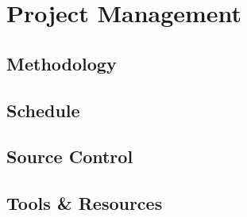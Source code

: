 \chapter{Project Management}
\section{Methodology}
\section{Schedule}
\section{Source Control}
\section{Tools \& Resources}
